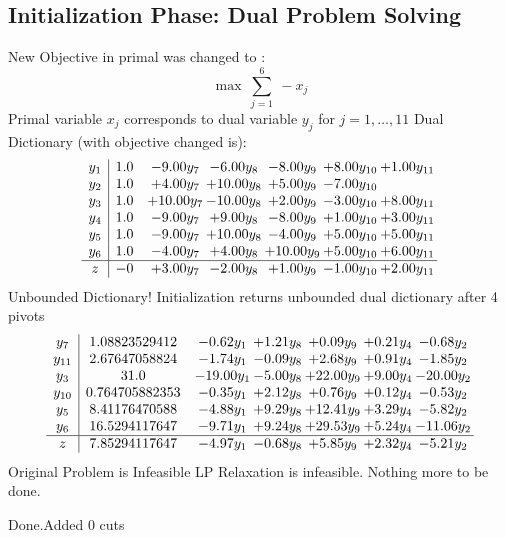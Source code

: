 \documentclass[8pt]{article}
\begin{document}
\subsection{Initialization Phase: Dual Problem Solving}
New Objective in primal was changed to : \[ \max\ \sum_{j=1}^{6}\ - x_j \] 
Primal variable $x_j$ corresponds to dual variable $y_j$ for $j = 1,\ldots,11$
Dual Dictionary (with objective changed is): 
\[\begin{array}{c| c c@{\hskip 2pt} c@{\hskip 2pt} c@{\hskip 2pt} c@{\hskip 2pt} c@{\hskip 2pt} }
 y_{1}   &  1.0 & -9.00 y_{7} & -6.00 y_{8} & -8.00 y_{9} & +  8.00 y_{10} & +  1.00 y_{11}\\
 y_{2}   &  1.0 & +  4.00 y_{7} & + 10.00 y_{8} & +  5.00 y_{9} & -7.00 y_{10} &   \\
 y_{3}   &  1.0 & + 10.00 y_{7} & -10.00 y_{8} & +  2.00 y_{9} & -3.00 y_{10} & +  8.00 y_{11}\\
 y_{4}   &  1.0 & -9.00 y_{7} & +  9.00 y_{8} & -8.00 y_{9} & +  1.00 y_{10} & +  3.00 y_{11}\\
 y_{5}   &  1.0 & -9.00 y_{7} & + 10.00 y_{8} & -4.00 y_{9} & +  5.00 y_{10} & +  5.00 y_{11}\\
 y_{6}   &  1.0 & -4.00 y_{7} & +  4.00 y_{8} & + 10.00 y_{9} & +  5.00 y_{10} & +  6.00 y_{11}\\
\hline
z    &  -0 & +  3.00 y_{7} & -2.00 y_{8} & +  1.00 y_{9} & -1.00 y_{10} & +  2.00 y_{11}\\
\end{array}\]
Unbounded Dictionary!
Initialization returns unbounded dual dictionary after 4 pivots
\[\begin{array}{c| c c@{\hskip 2pt} c@{\hskip 2pt} c@{\hskip 2pt} c@{\hskip 2pt} c@{\hskip 2pt} }
 y_{7}   &  1.08823529412 & -0.62 y_{1} & +  1.21 y_{8} & +  0.09 y_{9} & +  0.21 y_{4} & -0.68 y_{2}\\
 y_{11}   &  2.67647058824 & -1.74 y_{1} & -0.09 y_{8} & +  2.68 y_{9} & +  0.91 y_{4} & -1.85 y_{2}\\
 y_{3}   &  31.0 & -19.00 y_{1} & -5.00 y_{8} & + 22.00 y_{9} & +  9.00 y_{4} & -20.00 y_{2}\\
 y_{10}   &  0.764705882353 & -0.35 y_{1} & +  2.12 y_{8} & +  0.76 y_{9} & +  0.12 y_{4} & -0.53 y_{2}\\
 y_{5}   &  8.41176470588 & -4.88 y_{1} & +  9.29 y_{8} & + 12.41 y_{9} & +  3.29 y_{4} & -5.82 y_{2}\\
 y_{6}   &  16.5294117647 & -9.71 y_{1} & +  9.24 y_{8} & + 29.53 y_{9} & +  5.24 y_{4} & -11.06 y_{2}\\
\hline
z    &  7.85294117647 & -4.97 y_{1} & -0.68 y_{8} & +  5.85 y_{9} & +  2.32 y_{4} & -5.21 y_{2}\\
\end{array}\]
Original Problem is Infeasible
 LP Relaxation is infeasible. Nothing more to be done. 

Done.Added 0 cuts 
\end{document}
